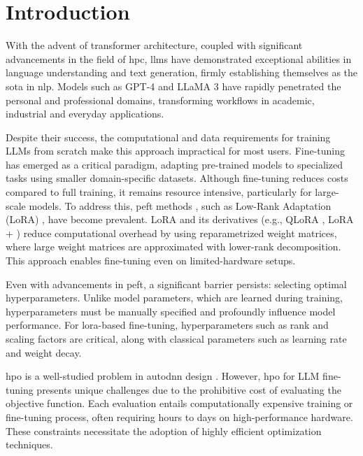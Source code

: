 \section{Introduction}
\label{sec:intro}

With the advent of transformer architecture\cite{vaswani_attention_2017}, coupled with significant advancements in the field of \acrfull{hpc}, \acrfull{llm}s have demonstrated exceptional abilities in language understanding and text generation, firmly establishing themselves as the \acrfull{sota} in \acrfull{nlp}. Models such as GPT-4 \cite{openai_gpt-4_2024} and LLaMA 3 \cite{grattafiori_llama_2024} have rapidly penetrated the personal and professional domains, transforming workflows in academic, industrial and everyday applications.

Despite their success, the computational and data requirements for training LLMs from scratch make this approach impractical for most users. Fine-tuning has emerged as a critical paradigm, adapting pre-trained models to specialized tasks using smaller domain-specific datasets. Although fine-tuning reduces costs compared to full training, it remains resource intensive, particularly for large-scale models. To address this, \acrfull{peft} methods \cite{han_parameter-efficient_2024}, such as Low-Rank Adaptation (LoRA) \cite{hu_lora_2021}, have become prevalent. LoRA and its derivatives (e.g., QLoRA \cite{dettmers_qlora_2023}, LoRA + \cite{hayou_lora_2024}) reduce computational overhead by using reparametrized weight matrices, where large weight matrices are approximated with lower-rank decomposition. This approach enables fine-tuning even on limited-hardware setups.

Even with advancements in \acrshort{peft}, a significant barrier persists: selecting optimal hyperparameters. Unlike model parameters, which are learned during training, hyperparameters must be manually specified and profoundly influence model performance. For \acrshort{lora}-based fine-tuning, hyperparameters such as rank and scaling factors are critical\cite{valipour_dylora_2023}, along with classical parameters such as learning rate and weight decay.

\acrfull{hpo} is a well-studied problem \cite{bischl_hyperparameter_2021,bergstra_algorithms_2011,feurer_hyperparameter_2019} in \acrfull{autodnn} design \cite{talbi_automated_2021}. However, \acrshort{hpo} for LLM fine-tuning presents unique challenges due to the prohibitive cost of evaluating the objective function. Each evaluation entails computationally expensive training or fine-tuning process, often requiring hours to days on high-performance hardware. These constraints necessitate the adoption of highly efficient optimization techniques.


